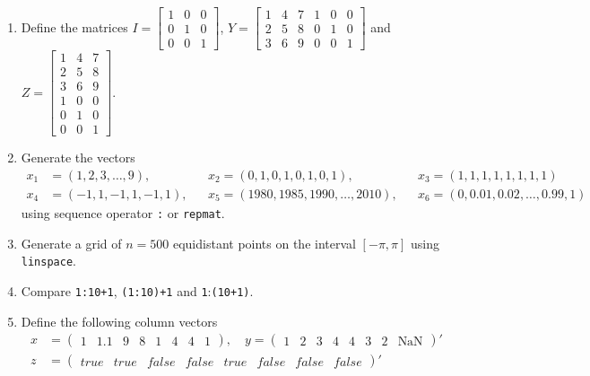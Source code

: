 \begin{enumerate}
\item
Define the matrices
\(I = \left[\begin{array}{lll} 1 & 0 & 0 \\ 0 & 1 & 0 \\ 0 & 0 & 1 \end{array}\right]\),
\(Y = \left[\begin{array}{lll} 1 & 4 & 7 \\ 2 & 5 & 8 \\ 3 & 6 & 9 \end{array}
            \begin{array}{lll} 1 & 0 & 0 \\ 0 & 1 & 0 \\ 0 & 0 & 1 \end{array}\right]\)
and
\(Z = \left[\begin{array}{lll} 1 & 4 & 7 \\ 2 & 5 & 8 \\ 3 & 6 & 9 \\ 1 & 0 & 0 \\ 0 & 1 & 0 \\ 0 & 0 & 1 \end{array}\right]\).

\item
Generate the vectors
\begin{align*}
x_{1} &= \left(  1, 2,  3, \ldots,  9          \right) ,&&
x_{2}  = \left(  0, 1,  0,      1,  0, 1, 0, 1 \right) ,&&
x_{3}  = \left(  1, 1,  1,      1,  1, 1, 1, 1 \right) \\
x_{4} &= \left( -1, 1, -1,      1, -1, 1       \right) ,&&
x_{5}  = \left( 1980, 1985, 1990, \ldots, 2010 \right) ,&&
x_{6}  = \left( 0, 0.01, 0.02, \ldots, 0.99, 1 \right)
\end{align*}
using sequence operator \texttt{:} or \texttt{repmat}.

\item
Generate a grid of \(n=500\) equidistant points on the interval \([-\pi,\pi]\) using \texttt{linspace}.

\item
Compare \texttt{1:10+1}, \texttt{(1:10)+1} and {\texttt{1}:\texttt{(10+1)}}.

\item
Define the following column vectors
\begin{align*}
x &= \begin{pmatrix} 1 & 1.1 & 9 & 8 & 1 & 4 & 4 & 1 \end{pmatrix}
,\quad
y = \begin{pmatrix} 1 & 2 & 3 & 4 & 4 & 3 & 2 & \text{NaN} \end{pmatrix}'
\\
z &= \begin{pmatrix} true & true & false & false & true & false & false & false	\end{pmatrix}'
\end{align*}


\end{enumerate}
